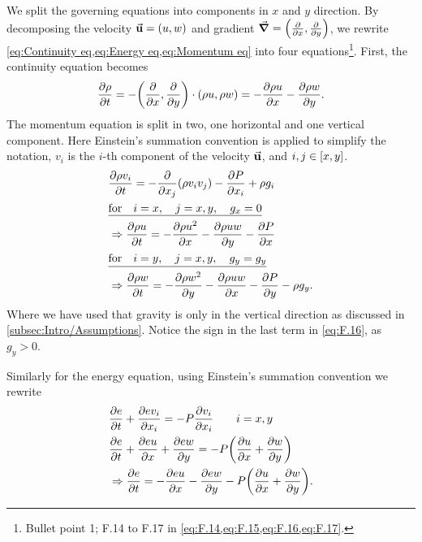\documentclass[11pt,a4paper,twocolumn,titlepage]{article}
\begin{document}
We split the governing equations into components in $x$ and $y$ direction. By decomposing the velocity $\va{u} = (u,w)$ and gradient $\grad = \qty(\pdv{x},\pdv{y})$, we rewrite \cref{eq:Continuity eq,eq:Energy eq,eq:Momentum eq} into four equations\footnote{Bullet point 1; F.14 to F.17 in \cref{eq:F.14,eq:F.15,eq:F.16,eq:F.17}.}. First, the continuity equation becomes
\begin{align}
\pdv{\rho}{t} = -\qty(\pdv{x},\pdv{y})\cdot\qty(\rho u, \rho w) = -\pdv{\rho u}{x} - \pdv{\rho w}{y} \label{eq:F.14}.
\end{align}
The momentum equation is split in two, one horizontal and one vertical component. Here Einstein's summation convention is applied to simplify the notation, $v_i$ is the $i$-th component of the velocity $\va{u}$, and $i, j \in \qty[x,y]$.
\begin{align}
&\pdv{\rho v_i}{t} = - \pdv{x_j}\qty(\rho v_i v_j) - \pdv{P}{x_i} + \rho g_i \notag
\\
&\underline{ \qq*{for}i = x \qc j = x,y \qc g_x = 0} \notag
\\
&\Rightarrow \pdv{\rho u}{t} = - \pdv{\rho u^2}{x} - \pdv{\rho u w}{y} - \pdv{P}{x} \label{eq:F.15}
\\
&\underline{ \qq*{for}i = y \qc j = x,y \qc g_y = g_y} \notag
\\
&\Rightarrow \pdv{\rho w}{t} = - \pdv{\rho w^2}{y} - \pdv{\rho u w}{x} - \pdv{P}{y} - \rho g_y. \label{eq:F.16}
\end{align}
Where we have used that gravity is only in the vertical direction as discussed in \cref{subsec:Intro/Assumptions}. Notice the sign in the last term in \cref{eq:F.16}, as $g_y>0$.

Similarly for the energy equation, using Einstein's summation convention we rewrite 
\begin{align}
&\pdv{e}{t} + \pdv{ev_i}{x_i} = - P\pdv{v_i}{x_i} \qquad i = x,y \notag
\\
&\pdv{e}{t} + \pdv{e u}{x} + \pdv{e w}{y} = -P\qty(\pdv{u}{x} + \pdv{w}{y}) \notag
\\
&\Rightarrow \pdv{e}{t} = -\pdv{eu}{x} - \pdv{ew}{y} - P\qty(\pdv{u}{x} + \pdv{w}{y}) \label{eq:F.17}.
\end{align}
\end{document}
